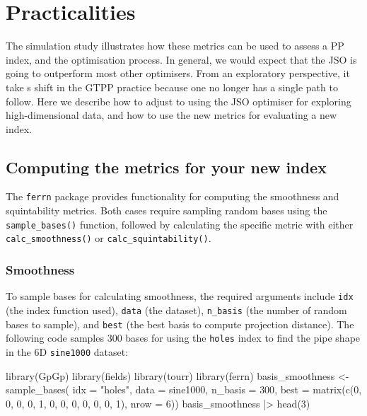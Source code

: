 \documentclass[
  12pt,
]{interact}
\newenvironment{Shaded}{\begin{snugshade}}{\end{snugshade}}
\newcommand{\AttributeTok}[1]{\textcolor[rgb]{0.40,0.45,0.13}{#1}}
\newcommand{\DecValTok}[1]{\textcolor[rgb]{0.68,0.00,0.00}{#1}}
\newcommand{\FunctionTok}[1]{\textcolor[rgb]{0.28,0.35,0.67}{#1}}
\newcommand{\NormalTok}[1]{\textcolor[rgb]{0.00,0.23,0.31}{#1}}
\newcommand{\OtherTok}[1]{\textcolor[rgb]{0.00,0.23,0.31}{#1}}
\newcommand{\SpecialCharTok}[1]{\textcolor[rgb]{0.37,0.37,0.37}{#1}}
\newcommand{\StringTok}[1]{\textcolor[rgb]{0.13,0.47,0.30}{#1}}
\theoremstyle{plain}
\begin{document}
\section{Practicalities}\label{sec-discussion}

The simulation study illustrates how these metrics can be used to assess
a PP index, and the optimisation process. In general, we would expect
that the JSO is going to outperform most other optimisers. From an
exploratory perspective, it take s shift in the GTPP practice because
one no longer has a single path to follow. Here we describe how to
adjust to using the JSO optimiser for exploring high-dimensional data,
and how to use the new metrics for evaluating a new index.

\subsection{Computing the metrics for your new
index}\label{computing-the-metrics-for-your-new-index}

The \texttt{ferrn} package provides functionality for computing the
smoothness and squintability metrics. Both cases require sampling random
bases using the \texttt{sample\_bases()} function, followed by
calculating the specific metric with either \texttt{calc\_smoothness()}
or \texttt{calc\_squintability()}.

\subsubsection{Smoothness}\label{smoothness}

To sample bases for calculating smoothness, the required arguments
include \texttt{idx} (the index function used), \texttt{data} (the
dataset), \texttt{n\_basis} (the number of random bases to sample), and
\texttt{best} (the best basis to compute projection distance). The
following code samples 300 bases for using the \texttt{holes} index to
find the pipe shape in the 6D \texttt{sine1000} dataset:

\begin{Shaded}
\begin{Highlighting}[]
\FunctionTok{library}\NormalTok{(GpGp)}
\FunctionTok{library}\NormalTok{(fields)}
\FunctionTok{library}\NormalTok{(tourr)}
\FunctionTok{library}\NormalTok{(ferrn)}
\NormalTok{basis\_smoothness }\OtherTok{\textless{}{-}} \FunctionTok{sample\_bases}\NormalTok{(}
  \AttributeTok{idx =} \StringTok{"holes"}\NormalTok{, }\AttributeTok{data =}\NormalTok{ sine1000, }\AttributeTok{n\_basis =} \DecValTok{300}\NormalTok{, }
  \AttributeTok{best =} \FunctionTok{matrix}\NormalTok{(}\FunctionTok{c}\NormalTok{(}\DecValTok{0}\NormalTok{, }\DecValTok{0}\NormalTok{, }\DecValTok{0}\NormalTok{, }\DecValTok{0}\NormalTok{, }\DecValTok{1}\NormalTok{, }\DecValTok{0}\NormalTok{, }\DecValTok{0}\NormalTok{, }\DecValTok{0}\NormalTok{, }\DecValTok{0}\NormalTok{, }\DecValTok{0}\NormalTok{, }\DecValTok{0}\NormalTok{, }\DecValTok{1}\NormalTok{), }\AttributeTok{nrow =} \DecValTok{6}\NormalTok{))}
\NormalTok{basis\_smoothness }\SpecialCharTok{|\textgreater{}} \FunctionTok{head}\NormalTok{(}\DecValTok{3}\NormalTok{)}
\end{Highlighting}
\end{Shaded}
\end{document}
